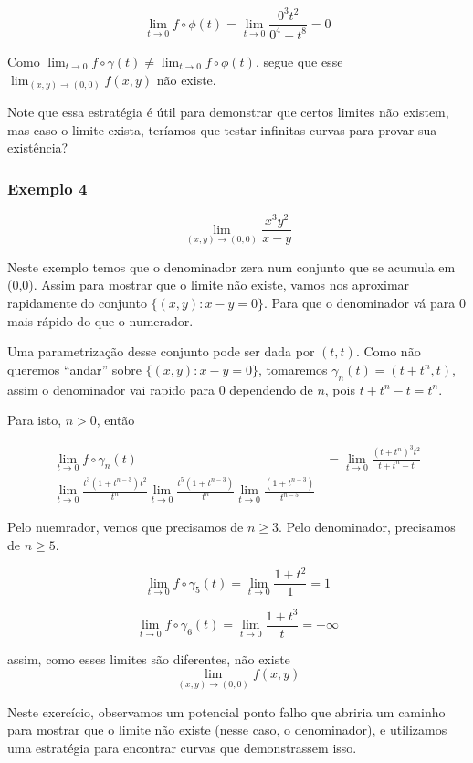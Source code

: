 \documentclass[
  portuguese,
  letterpaper,
  DIV=11,
  numbers=noendperiod]{scrreport}
\begin{document}
\[
\lim_{t\rightarrow 0} f \circ \phi (t) = \lim_{t\rightarrow 0} \frac{0^3 t^2}{0^4+t^8} = 0
\]

Como
\(\lim_{t\rightarrow 0} f \circ \gamma (t) \neq \lim_{t\rightarrow 0} f \circ \phi(t)\),
segue que esse \(\lim_{(x,y)\rightarrow (0,0)} f(x,y)\) não existe.

Note que essa estratégia é útil para demonstrar que certos limites não
existem, mas caso o limite exista, teríamos que testar infinitas curvas
para provar sua existência?

\subsubsection{Exemplo 4}\label{exemplo-4}

\[
\lim_{(x,y) \rightarrow (0,0)} \frac{x^3 y^2}{x-y}
\]

Neste exemplo temos que o denominador zera num conjunto que se acumula
em (0,0). Assim para mostrar que o limite não existe, vamos nos
aproximar rapidamente do conjunto \(\{(x,y):x-y =0\}\). Para que o
denominador vá para \(0\) mais rápido do que o numerador.

Uma parametrização desse conjunto pode ser dada por \((t,t)\). Como não
queremos ``andar'' sobre \(\{(x,y):x-y =0\}\), tomaremos
\(\gamma_n (t) = (t+t^n,t)\), assim o denominador vai rapido para 0
dependendo de \(n\), pois \(t+t^n-t = t^n\).

Para isto, \(n>0\), então

\[
\begin{aligned}
\lim_{t\rightarrow 0} f \circ \gamma_{n}(t) &= \lim_{t\rightarrow 0}
\frac{(t+t^n)^3t^2}{t+t^n-t} \\
\lim_{t\rightarrow 0} \frac{t^3 (1+t^{n-3})t^2}{t^n}
\lim_{t\rightarrow 0} \frac{t^5 (1+t^{n-3})}{t^n}
\lim_{t\rightarrow 0} \frac{(1+t^{n-3})}{t^{n-5}}
\end{aligned}
\]

Pelo nuemrador, vemos que precisamos de \(n\geq 3\). Pelo denominador,
precisamos de \(n \geq 5\).

\[
\lim_{t\rightarrow 0} f\circ \gamma_5 (t) = \lim_{t\rightarrow 0} \frac{1+t^2}{1} = 1
\]

\[
\lim_{t\rightarrow 0} f\circ \gamma_6 (t) = \lim_{t\rightarrow 0} \frac{1+t^3}{t} = +\infty
\]

assim, como esses limites são diferentes, não existe \[
\lim_{(x,y)\rightarrow(0,0)} f(x,y)
\]

Neste exercício, observamos um potencial ponto falho que abriria um
caminho para mostrar que o limite não existe (nesse caso, o
denominador), e utilizamos uma estratégia para encontrar curvas que
demonstrassem isso.
\end{document}
